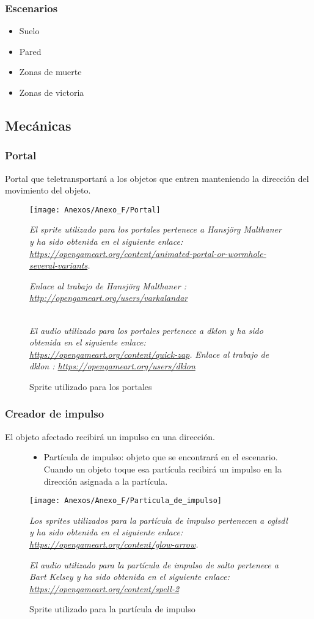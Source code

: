 \subsubsection{Escenarios}
\begin{itemize}
\item
Suelo
\item
Pared
\item
Zonas de muerte
\item
Zonas de victoria
\end{itemize}

\subsection{Mecánicas}
\subsubsection{Portal}
Portal que teletransportará a los objetos que entren manteniendo la dirección del movimiento del objeto.

\begin{figure}[h]
\centering
\texttt{[image: Anexos/Anexo\_F/Portal]}
\caption{Sprite utilizado para los portales}
\raggedright
\textit{El sprite utilizado para los portales pertenece a Hansjörg Malthaner y ha sido obtenida en el siguiente enlace: \url{https://opengameart.org/content/animated-portal-or-wormhole-several-variants}.}

\textit{Enlace al trabajo de Hansjörg Malthaner : \url{http://opengameart.org/users/varkalandar}}

\textit{\\El audio utilizado para los portales pertenece a dklon y ha sido obtenida en el siguiente enlace: \url{https://opengameart.org/content/quick-zap}.}
\textit{Enlace al trabajo de dklon : \url{https://opengameart.org/users/dklon}}
\end{figure}

\subsubsection{Creador de impulso}
El objeto afectado recibirá un impulso en una dirección.
\begin{figure}[h]
\begin{itemize}
\item
Partícula de impulso: objeto que se encontrará en el escenario. Cuando un objeto toque esa partícula recibirá un impulso en la dirección asignada a la partícula.
\end{itemize}
\centering
\texttt{[image: Anexos/Anexo\_F/Particula\_de\_impulso]}
\caption{Sprite utilizado para la partícula de impulso}
\raggedright
\textit{Los sprites utilizados para la partícula de impulso pertenecen a oglsdl y ha sido obtenida en el siguiente enlace: \url{https://opengameart.org/content/glow-arrow}.}

\textit{El audio utilizado para la partícula de impulso de salto pertenece a Bart Kelsey y ha sido obtenida en el siguiente enlace: \url{https://opengameart.org/content/spell-2}}
\end{figure}


